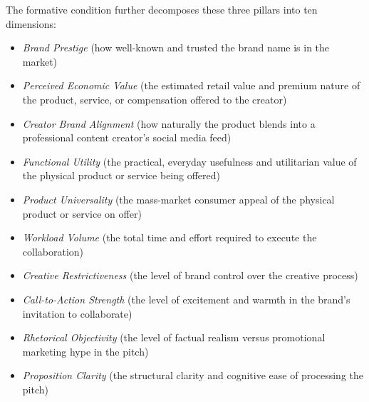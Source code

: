 The formative condition further decomposes these three pillars into ten dimensions:
\begin{itemize}
    \item \textit{Brand Prestige} (how well-known and trusted the brand name is in the market)
    \item \textit{Perceived Economic Value} (the estimated retail value and premium nature of the product, service, or compensation offered to the creator)
    \item \textit{Creator Brand Alignment} (how naturally the product blends into a professional content creator's social media feed)
    \item \textit{Functional Utility} (the practical, everyday usefulness and utilitarian value of the physical product or service being offered)
    \item \textit{Product Universality} (the mass-market consumer appeal of the physical product or service on offer)
    \item \textit{Workload Volume} (the total time and effort required to execute the collaboration)
    \item \textit{Creative Restrictiveness} (the level of brand control over the creative process)
    \item \textit{Call-to-Action Strength} (the level of excitement and warmth in the brand's invitation to collaborate)
    \item \textit{Rhetorical Objectivity} (the level of factual realism versus promotional marketing hype in the pitch)
    \item \textit{Proposition Clarity} (the structural clarity and cognitive ease of processing the pitch)
\end{itemize}





